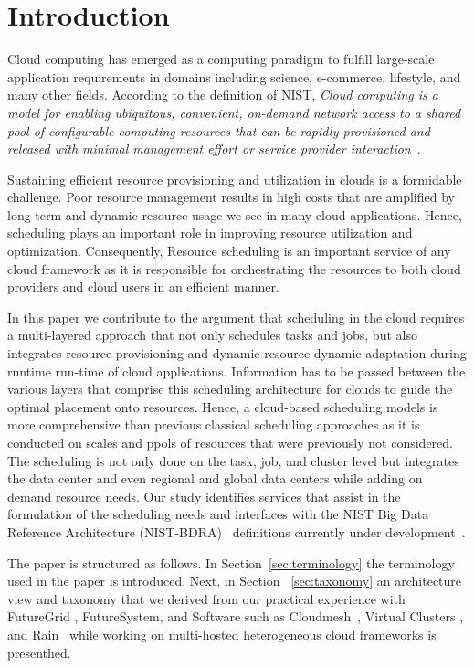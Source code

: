 \documentclass[final,5p,times,twocolumn]{elsarticle}
\begin{document}
\color{black}

\section{Introduction}


Cloud computing has emerged as a computing paradigm to fulfill large-scale
application requirements in domains including science, e-commerce, lifestyle,
and many other fields. According to the definition of NIST, {\em Cloud computing
is a model for enabling ubiquitous, convenient, on-demand network access to a
shared pool of configurable computing resources that can be rapidly provisioned
and released with minimal management effort or service provider
interaction}~\cite{mell2011nist}.

Sustaining efficient resource provisioning and utilization in clouds is a
formidable challenge. Poor resource management results in high costs that are
amplified by long term and dynamic resource usage we see in many cloud
applications. Hence, scheduling plays an important role in improving resource
utilization and optimization. Consequently, Resource scheduling is an important
service of any cloud framework as it is responsible for orchestrating the
resources to both cloud providers and cloud users in an efficient manner.

In this paper we contribute to the argument that scheduling in the cloud
requires a multi-layered approach that not only schedules tasks and jobs, but
also integrates resource provisioning and dynamic resource dynamic adaptation
during runtime run-time of cloud applications. Information has to be passed
between the various layers that comprise this scheduling architecture for clouds
to guide the optimal placement onto resources. Hence, a cloud-based scheduling
models is more comprehensive than previous classical scheduling approaches as it
is conducted on scales and ppols of resources that were previously not
considered. The scheduling is not only done on the task, job, and cluster level
but integrates the data center and even regional and global data centers while
adding on demand resource needs. Our study identifies services that assist in
the formulation of the scheduling needs and interfaces with the NIST Big Data
Reference Architecture (NIST-BDRA)~\cite{nist-bdra-vol6}
definitions currently under development~\cite{nist-bdra-vol8}.

The paper is structured as follows.  In Section~\ref{sec:terminology} the
terminology used in the paper is introduced. Next, in
Section ~\ref{sec:taxonomy} an architecture view and taxonomy that we
derived from our practical experience with FutureGrid
\cite{las12fg-bookchapter,fox2013futuregrid}, FutureSystem, and Software such as
Cloudmesh~\cite{von2014accessing}, Virtual Clusters \cite{las-comet}, and
Rain~\cite{las-fg-1295,las10dynamic,las-rain} while working on multi-hosted
heterogeneous cloud frameworks is presenthed.
\end{document}

